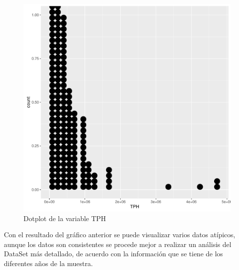 \documentclass[conference]{IEEEtran}\usepackage[]{graphicx}\usepackage[]{color}
\makeatletter
\def\maxwidth{ %
  \ifdim\Gin@nat@width>\linewidth
    \linewidth
  \else
    \Gin@nat@width
  \fi
}
\newenvironment{knitrout}{}{} %
\makeatother
\begin{document}
\begin{figure}[H]
	\centering
\begin{knitrout}
\color{fgcolor}
\includegraphics[width=\maxwidth]{figure/atipicos-1} 

\end{knitrout}
	\caption{Dotplot de la variable TPH}
\end{figure}

Con el resultado del gráfico anterior se puede visualizar varios datos atípicos, aunque los datos son consistentes se procede mejor a realizar un análisis del DataSet más detallado, de acuerdo con la información que se tiene de los diferentes años de la muestra.

\end{document}
